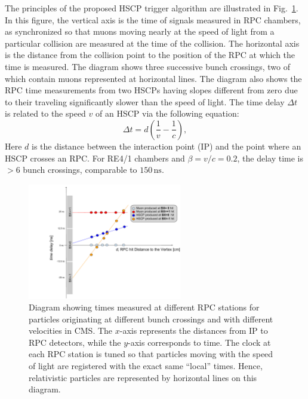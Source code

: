 The principles of the proposed HSCP trigger algorithm are illustrated in Fig.~\ref{fig:HSCP_diagram}. In this figure, the vertical axis is the time of signals measured in RPC chambers, as synchronized so that muons moving nearly at the speed of light from a particular collision are measured at the time of the collision. The horizontal axis is the distance from the collision point to the position of the RPC at which the time is measured. The diagram shows three successive bunch crossings, two of which contain muons represented at horizontal lines. The diagram also shows the RPC time measurements from two HSCPs having slopes different from zero due to their traveling significantly slower than the speed of light. The time delay $\Delta t$ is related to the speed $v$ of an HSCP via the following equation:
%
\begin{equation}
\label{eq:HSCP_delay}
\Delta t = d\left(\frac{1}{v}-\frac{1}{c}\right),
\end{equation}
%
Here $d$ is the distance between the interaction point (IP) and the point where an HSCP crosses an RPC. For RE4/1 chambers and $\beta = v/c = 0.2$, the delay time is $>6$ bunch crossings, comparable to $150 \, \mathrm{ns}$.

\begin{figure}[t]
  \centering
  \includegraphics[width=0.6\textwidth]{figures/HSCP/diagram.pdf}
  \caption{Diagram showing times measured at different RPC stations for particles originating at different bunch crossings and with different velocities in CMS. The $x$-axis represents the distances from IP to RPC detectors, while the $y$-axis corresponds to time. The clock at each RPC station is tuned so that particles moving with the speed of light are registered with the exact same ``local'' times. Hence, relativistic particles are represented by horizontal lines on this diagram.}
  \label{fig:HSCP_diagram}
\end{figure}

